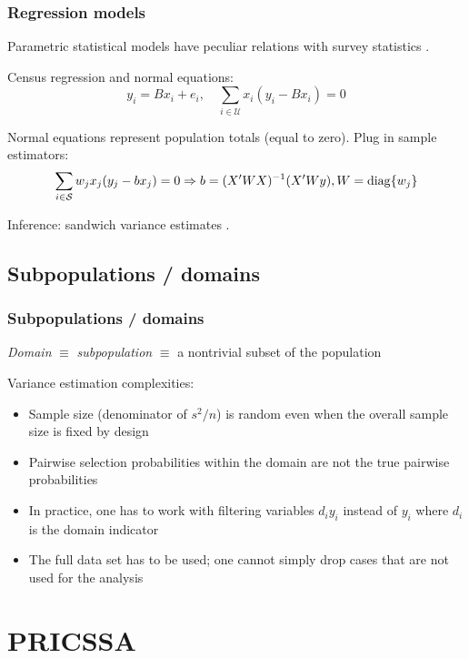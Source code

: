 \documentclass{beamer}
\begin{document}
\begin{frame}\frametitle{Regression models}

Parametric statistical models have peculiar relations with survey statistics
\citep{skinner:1989,binder:roberts:2003,binder:roberts:2009,pfeffermann:2011:whymodel}.

Census regression and normal equations:
$$
y_i = B x_i + e_i, \quad \sum_{i\in\mathcal{U}} x_i (y_i - B x_i) = 0
$$

Normal equations represent population totals (equal to zero). Plug in sample estimators:
$$
\sum_{i\in\mathcal{S}} w_j x_j (y_j - b x_j) = 0 \Rightarrow b = (X'WX)^{-1} (X'Wy), W = {\rm diag}\{ w_j \}
$$

Inference: sandwich variance estimates \citep{fuller:1975,binder:1983}.

\end{frame}

\subsection{Subpopulations / domains}

\begin{frame}\frametitle{Subpopulations / domains}

\textit{Domain} $\equiv$ \textit{subpopulation} $\equiv$ a nontrivial subset of the population

\bigskip

Variance estimation complexities:
\begin{itemize}
    \item Sample size (denominator of $s^2/n$) is random even when the overall sample size is fixed by design
    \item Pairwise selection probabilities within the domain are not the true pairwise probabilities
    \item In practice, one has to work with filtering variables $d_i y_i$ instead of $y_i$ where
        $d_i$ is the domain indicator
    \item The full data set has to be used; one cannot simply drop cases that are not used for the analysis
\end{itemize}

\citet{west:berglund:heeringa:2008}

\end{frame}

\section{PRICSSA}
\end{document}

